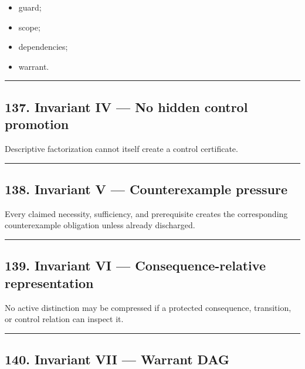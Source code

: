 \documentclass[
]{article}
\providecommand{\tightlist}{%
  \setlength{\itemsep}{0pt}\setlength{\parskip}{0pt}}
\begin{document}
\begin{itemize}
\tightlist
\item
  guard;
\item
  scope;
\item
  dependencies;
\item
  warrant.
\end{itemize}

\begin{center}\rule{0.5\linewidth}{0.5pt}\end{center}

\subsection{137. Invariant IV --- No hidden control
promotion}\label{invariant-iv-no-hidden-control-promotion}

Descriptive factorization cannot itself create a control certificate.

\begin{center}\rule{0.5\linewidth}{0.5pt}\end{center}

\subsection{138. Invariant V --- Counterexample
pressure}\label{invariant-v-counterexample-pressure}

Every claimed necessity, sufficiency, and prerequisite creates the
corresponding counterexample obligation unless already discharged.

\begin{center}\rule{0.5\linewidth}{0.5pt}\end{center}

\subsection{139. Invariant VI --- Consequence-relative
representation}\label{invariant-vi-consequence-relative-representation}

No active distinction may be compressed if a protected consequence,
transition, or control relation can inspect it.

\begin{center}\rule{0.5\linewidth}{0.5pt}\end{center}

\subsection{140. Invariant VII --- Warrant
DAG}\label{invariant-vii-warrant-dag}
\end{document}
